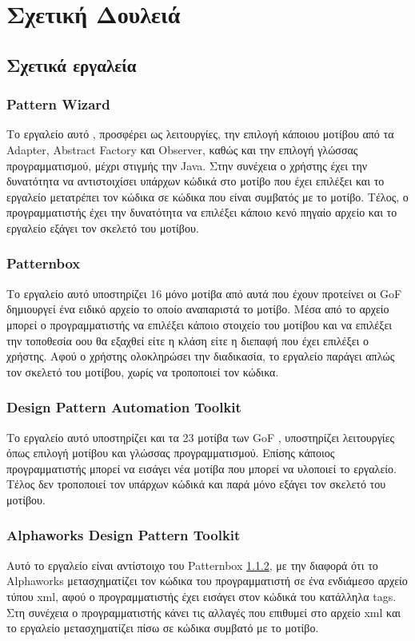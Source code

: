 \chapter{Σχετική Δουλειά}
\label{ch:relativeWork}
\section{Σχετικά εργαλεία}
\label{sec:relativeTools}
\subsection{Pattern Wizard}
\label{subsec:patternWizard}
Το εργαλείο αυτό \cite{PatternBox}, προσφέρει ως λειτουργίες, την επιλογή κάποιου μοτίβου 
από τα Adapter, Abstract Factory και Observer, καθώς και την επιλογή γλώσσας προγραμματισμού, μέχρι στιγμής την Java. Στην συνέχεια 
ο χρήστης έχει την δυνατότητα να αντιστοιχίσει υπάρχων κώδικά στο μοτίβο που έχει επιλέξει και το εργαλείο μετατρέπει τον κώδικα 
σε κώδικα που είναι συμβατός με το μοτίβο. Τέλος, ο προγραμματιστής έχει την δυνατότητα να επιλέξει κάποιο κενό πηγαίο αρχείο και 
το εργαλείο εξάγει τον σκελετό του μοτίβου.
\subsection{Patternbox}
\label{subsec:Patternbox}
Το εργαλείο αυτό \cite{PatternBox} υποστηρίζει 16 μόνο μοτίβα από αυτά που έχουν προτείνει οι GoF \cite{GoF} δημιουργεί ένα ειδικό 
αρχείο το οποίο αναπαριστά το μοτίβο. Μέσα από το αρχείο μπορεί ο προγραμματιστής να επιλέξει κάποιο στοιχείο του μοτίβου και 
να επιλέξει την τοποθεσία οου θα εξαχθεί είτε η κλάση είτε η διεπαφή που έχει επιλέξει ο χρήστης. 
Αφού ο χρήστης ολοκληρώσει την διαδικασία, το εργαλείο παράγει απλώς τον σκελετό του μοτίβου, χωρίς να τροποποιεί τον κώδικα.
\subsection{Design Pattern Automation Toolkit}
\label{subsec:dpa}
Το εργαλείο αυτό \cite{PatternBox} υποστηρίζει και τα 23 μοτίβα των GoF \cite{GoF}, υποστηρίζει λειτουργίες 
όπως επιλογή μοτίβου και γλώσσας προγραμματισμού. Επίσης κάποιος προγραμματιστής μπορεί να εισάγει νέα μοτίβα που μπορεί να 
υλοποιεί το εργαλείο.
Τέλος δεν τροποποιεί τον υπάρχων κώδικά και παρά μόνο εξάγει τον σκελετό του μοτίβου.
\subsection{Alphaworks Design Pattern Toolkit}
\label{subsec:ALPHAWORKS}
Αυτό το εργαλείο \cite{PatternBox} είναι αντίστοιχο του Patternbox \ref{subsec:Patternbox}, με την διαφορά ότι το Alphaworks 
μετασχηματίζει τον κώδικα
του προγραμματιστή σε ένα ενδιάμεσο αρχείο τύπου xml, αφού ο προγραμματιστής έχει εισάγει στον κώδικά του κατάλληλα tags.
Στη συνέχεια ο προγραμματιστής κάνει τις αλλαγές που επιθυμεί στο αρχείο xml και το εργαλείο μετασχηματίζει πίσω σε κώδικα συμβατό με το 
μοτίβο.
